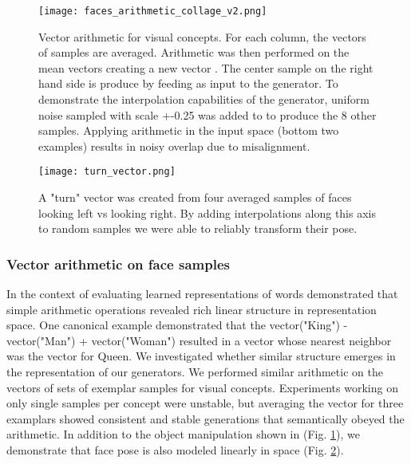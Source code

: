 \documentclass{article} \usepackage{iclr2016_conference,times}
\begin{document}
\begin{figure}[h!]
\begin{center}
\texttt{[image: faces\_arithmetic\_collage\_v2.png]}
\end{center}
\caption{\label{fig_faces_vector_arithmetic}Vector arithmetic for visual concepts. For each column, the  vectors of samples are averaged. Arithmetic was then performed on the mean vectors creating a new vector . The center sample on the right hand side is produce by feeding  as input to the generator. To demonstrate the interpolation capabilities of the generator, uniform noise sampled with scale +-0.25 was added to  to produce the 8 other samples. Applying arithmetic in the input space (bottom two examples) results in noisy overlap due to misalignment.}
\end{figure}

\begin{figure}[h!]
\begin{center}
\texttt{[image: turn\_vector.png]}
\end{center}
\caption{\label{fig_faces_vector_turn}A "turn" vector was created from four averaged samples of faces looking left vs looking right. By adding interpolations along this axis to random samples we were able to reliably transform their pose.}
\end{figure}


\subsubsection{Vector arithmetic on face samples}

In the context of evaluating learned representations of words \citep{mikolov2013distributed} demonstrated that simple arithmetic operations revealed rich linear structure in representation space. One canonical example demonstrated that the vector("King") - vector("Man") + vector("Woman") resulted in a vector whose nearest neighbor was the vector for Queen. We investigated whether similar structure emerges in the  representation of our generators. We performed similar arithmetic on the  vectors of sets of exemplar samples for visual concepts. Experiments working on only single samples per concept were unstable, but averaging the  vector for three examplars showed consistent and stable generations that semantically obeyed the arithmetic. In addition to the object manipulation shown in (Fig. \ref{fig_faces_vector_arithmetic}), we demonstrate that face pose is also modeled linearly in  space (Fig. \ref{fig_faces_vector_turn}).  
\end{document}
